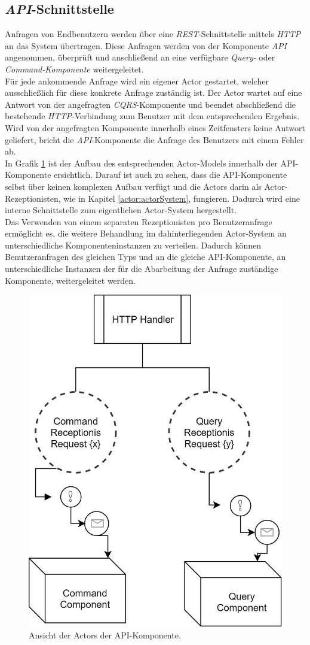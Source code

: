 \subsection{\textit{API}-Schnittstelle}
\label{subsec:implementation:apiComponente}
Anfragen von Endbenutzern werden über eine \textit{REST}-Schnittstelle mittels \textit{HTTP} an das System übertragen. Diese Anfragen werden von der Komponente \textit{API} angenommen, überprüft und anschließend an eine verfügbare \textit{Query-} oder \textit{Command-Komponente} weitergeleitet. \\
Für jede ankommende Anfrage wird ein eigener Actor gestartet, welcher ausschließlich für diese konkrete Anfrage zuständig ist. Der Actor wartet auf eine Antwort von der angefragten \textit{CQRS}-Komponente und beendet abschließend die bestehende \textit{HTTP}-Verbindung zum Benutzer mit dem entsprechenden Ergebnis. Wird von der angefragten Komponente innerhalb eines Zeitfensters keine Antwort geliefert, bricht die \textit{API}-Komponente die Anfrage des Benutzers mit einem Fehler ab. \\
In Grafik \ref{fig:implementation:apiActorModel} ist der Aufbau des entsprechenden  Actor-Models innerhalb der API-Komponente ersichtlich. Darauf ist auch zu sehen, dass die API-Komponente selbst über keinen komplexen Aufbau verfügt und die Actors darin als Actor-Rezeptionisten, wie in Kapitel \ref{actor:actorSystem}, fungieren. Dadurch wird eine interne Schnittstelle zum eigentlichen Actor-System hergestellt. \\
Das Verwenden von einem separaten Rezeptionisten pro Benutzeranfrage ermöglicht es, die weitere Behandlung im dahinterliegenden Actor-System an unterschiedliche Komponenteninstanzen zu verteilen. Dadurch können Benutzeranfragen des gleichen Typs und an die gleiche API-Komponente, an unterschiedliche Instanzen der für die Abarbeitung der Anfrage zuständige Komponente, weitergeleitet werden. 
\begin{figure}
  \centering
  \includegraphics[width=0.5\linewidth]{gfx/implementation/apiActorModel}
  \caption{Ansicht der Actors der API-Komponente.}
  \label{fig:implementation:apiActorModel}
\end{figure} 

